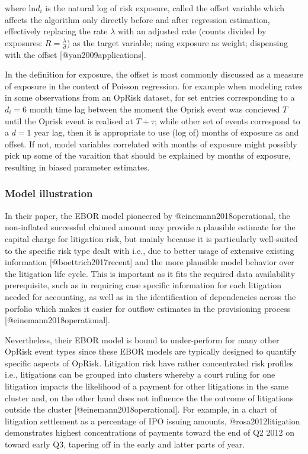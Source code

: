 \documentclass[]{article}
\begin{document}
where ln\(d_i\) is the natural log of risk exposure, called the offset
variable which affects the algorithm only directly before and after
regression estimation, effectively replacing the rate \(\lambda\) with
an adjusted rate (counts divided by exposures: \(R=\frac{\lambda}{d}\))
as the target variable; using exposure as weight; dispensing with the
offset {[}@yan2009applications{]}.\medskip  

In the definition for exposure, the offset is most commonly discussed as
a measure of exposure in the context of Poisson regression. for example
when modeling rates in some observations from an OpRisk dataset, for set
entries corresponding to a \(d_i=6\) month time lag between the moment
the Oprisk event was concieved \(T\) until the Oprisk event is realised
at \(T+\tau\); while other set of events correspond to a \(d=1\) year
lag, then it is appropriate to use (log of) months of exposure as and
offset. If not, model variables correlated with months of exposure might
possibly pick up some of the varaition that should be explained by
months of exposure, resulting in biased parameter estimates.

\subsubsection{Model illustration}
\label{sssec:Model illustration}

In their paper, the EBOR model pioneered by @einemann2018operational,
the non-inflated successful claimed amount may provide a plausible
estimate for the capital charge for litigation risk, but mainly because
it is particularly well-suited to the specific risk type dealt with
i.e., due to better usage of extensive existing information
{[}@boettrich2017recent{]} and the more plausible model behavior over
the litigation life cycle. This is important as it fits the required
data availability prerequisite, such as in requiring case specific
information for each litigation needed for accounting, as well as in the
identification of dependencies across the porfolio which makes it easier
for outflow estimates in the provisioning process
{[}@einemann2018operational{]}.\medskip 

Nevertheless, their EBOR model is bound to under-perform for many other
OpRisk event types since these EBOR models are typically designed to
quantify specific aspects of OpRisk. Litigation risk have rather
concentrated risk profiles i.e., litigations can be grouped into
clusters whereby a court ruling for one litigation impacts the
likelihood of a payment for other litigations in the same cluster and,
on the other hand does not influence the the outcome of litigations
outside the cluster {[}@einemann2018operational{]}. For example, in a
chart of litigation settlement as a percentage of IPO issuing amounts,
@rosa2012litigation demonstrates highest concentrations of payments
toward the end of Q2 2012 on toward early Q3, tapering off in the early
and latter parts of year.\medskip
\end{document}
